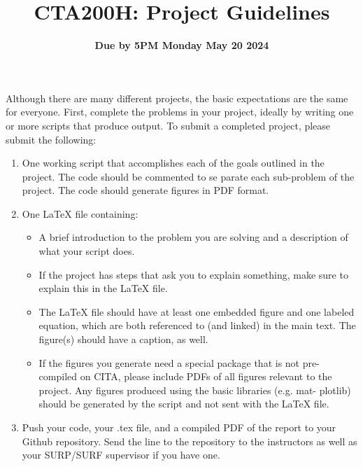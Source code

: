 \documentclass{article}
\title{CTA200H: Project Guidelines}
\author{}
\date{\bf Due by 5PM Monday May 20 2024}
\begin{document}
\maketitle


Although there are many different projects, the basic expectations are the same for everyone. First, complete the problems in your project, ideally by writing one or more scripts that produce output.
To submit a completed project, please submit the following:

\begin{enumerate}
\item
  One working script that accomplishes each of the goals outlined in the project. The code should be commented to se
  parate each sub-problem of the project. The code should generate figures in PDF format.
\item One LaTeX file containing:
  \begin{itemize}
\item A brief introduction to the problem you are solving and a description of what your script does.
\item If the project has steps that ask you to explain something, make sure to explain this in the LaTeX file.
\item The LaTeX file should have at least one embedded figure and one labeled equation, which are both referenced to (and linked) in the main text. The figure(s) should have a caption, as well.
\item If the figures you generate need a special package that is not pre- compiled on CITA, please include PDFs of all figures relevant to the project. Any figures produced using the basic libraries (e.g. mat- plotlib) should be generated by the script and not sent with the LaTeX file.
  \end{itemize}
\item Push your code, your .tex file, and a compiled PDF of the report to your Github repository. Send the line to the repository to the instructors as well as your SURP/SURF supervisor if you have one.
\end{enumerate}
\end{document}
